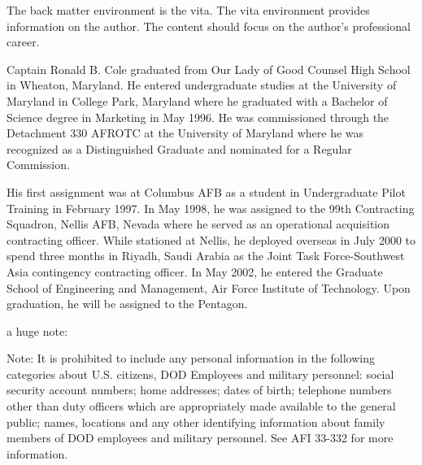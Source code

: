 \begin{vita}

The back matter environment is the vita.  The vita environment
provides information on the author.  The content should focus on the
author's professional career.

Captain Ronald B. Cole graduated from Our Lady of Good Counsel High School in Wheaton, Maryland. He entered undergraduate studies at the University of Maryland in College Park, Maryland where he graduated with a Bachelor of Science degree in Marketing in May 1996. He was commissioned through the Detachment 330 AFROTC at the University of Maryland where he was recognized as a Distinguished Graduate and nominated for a Regular Commission.

His first assignment was at Columbus AFB as a student in Undergraduate Pilot Training in February 1997. In May 1998, he was assigned to the 99th Contracting Squadron, Nellis AFB, Nevada where he served as an operational acquisition contracting officer. While stationed at Nellis, he deployed overseas in July 2000 to spend three months in Riyadh, Saudi Arabia as the Joint Task Force-Southwest Asia contingency contracting officer. In May 2002, he entered the Graduate School of Engineering and Management, Air Force Institute of Technology. Upon graduation, he will be assigned to the Pentagon.

a huge note:

Note: It is prohibited to include any personal information in the following categories about U.S. citizens, DOD Employees and military personnel: social security account numbers; home addresses; dates of birth; telephone numbers other than duty officers which are appropriately made available to the general public; names, locations and any other identifying information about family members of DOD employees and military personnel. See AFI 33-332 for more information.

\end{vita}



 



